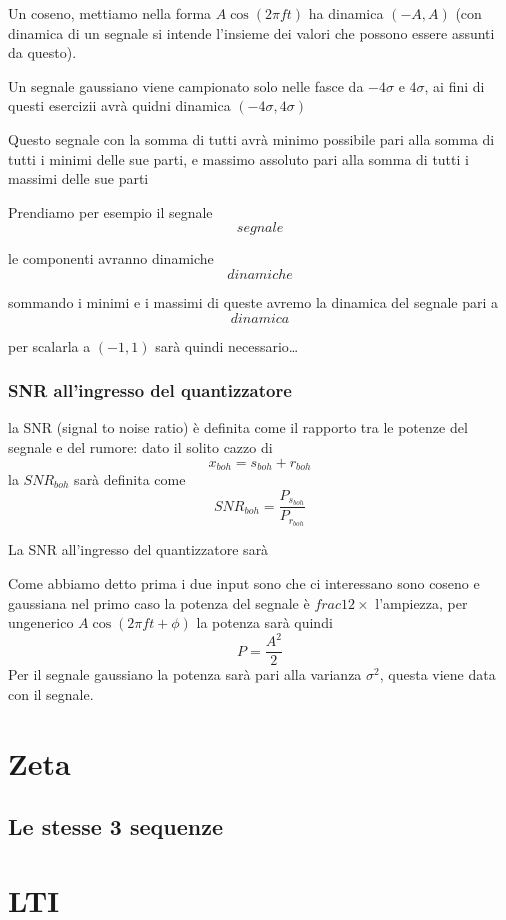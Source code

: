 \documentclass[11pt]{article}
\begin{document}
Un coseno, mettiamo nella forma \(A \cos (2\pi ft)\) ha dinamica \((-A,
A)\) (con dinamica di un segnale si intende l'insieme dei valori che
possono essere assunti da questo).

Un segnale gaussiano viene campionato solo nelle fasce da \(-4\sigma\) e
\(4\sigma\), ai fini di questi esercizii avrà quidni dinamica
\((-4\sigma, 4\sigma)\)

Questo segnale con la somma di tutti avrà minimo possibile pari alla
somma di tutti i minimi delle sue parti, e massimo assoluto pari alla
somma di tutti i massimi delle sue parti

Prendiamo per esempio il segnale
\[ segnale \]

le componenti avranno dinamiche
\[ dinamiche \]

sommando i minimi e i massimi di queste avremo la dinamica del segnale
pari a
\[ dinamica \]

per scalarla a \((-1, 1)\) sarà quindi necessario\ldots{}

\subsubsection{SNR all'ingresso del quantizzatore}
\label{sec:orgd955887}
la SNR (signal to noise ratio) è definita come il rapporto tra le
potenze del segnale e del rumore: dato il solito cazzo di
\[x_{boh} = s_{boh} + r_{boh}\]
la \(SNR_{boh}\) sarà definita come
\[SNR_{boh} = \frac{P_{s_{boh}}}{P_{r_{boh}}}\]

La SNR all'ingresso del quantizzatore sarà

Come abbiamo detto prima i due input sono che ci interessano sono
coseno e gaussiana nel primo caso la potenza del segnale è \(frac{1}{2}
\times\) l'ampiezza, per ungenerico \(A \cos(2\pi f t + \phi)\) la
potenza sarà quindi
\[P = \frac{A^2}{2}\] 
Per il segnale gaussiano la potenza sarà pari alla varianza \(\sigma
^2\), questa viene data con il segnale.


\section{Zeta}
\label{sec:orgfe3ad1a}
\subsection{Le stesse 3 sequenze}
\label{sec:orgb89bcfa}

\section{LTI}
\label{sec:org78f31e6}
\end{document}
